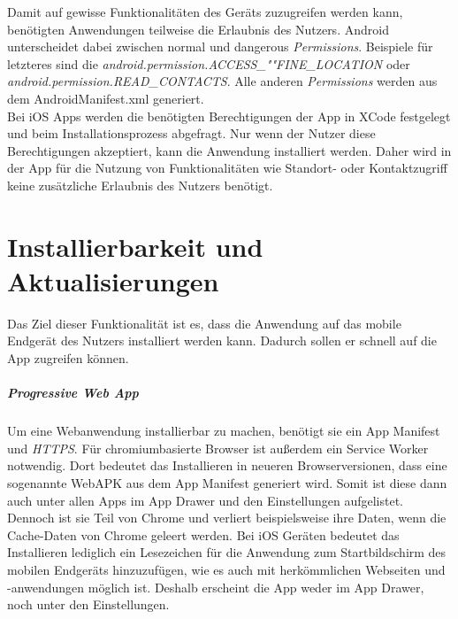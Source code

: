 Damit auf gewisse Funktionalitäten des Geräts zuzugreifen werden kann, benötigten Anwendungen teilweise die Erlaubnis des Nutzers.
Android unterscheidet dabei zwischen \glqq normal\grqq{} und \glqq dangerous\grqq{} \textit{Permissions}.
Beispiele für letzteres sind die \textit{android.permission.ACCESS\_""FINE\_LOCATION} oder \textit{android.permission.READ\_CONTACTS}.
Alle anderen \textit{Permissions} werden aus dem AndroidManifest.xml generiert.\\
Bei iOS Apps werden die benötigten Berechtigungen der App in XCode festgelegt und beim Installationsprozess abgefragt.
Nur wenn der Nutzer diese Berechtigungen akzeptiert, kann die Anwendung installiert werden.
Daher wird in der App für die Nutzung von Funktionalitäten wie Standort- oder Kontaktzugriff keine zusätzliche Erlaubnis des Nutzers benötigt.

\section{Installierbarkeit und Aktualisierungen}

Das Ziel dieser Funktionalität ist es, dass die Anwendung auf das mobile Endgerät des Nutzers installiert werden kann.
Dadurch sollen er schnell auf die App zugreifen können.

\subparagraph{Progressive Web App\\}
Um eine Webanwendung installierbar zu machen, benötigt sie ein App Manifest und \textit{HTTPS}.
Für chromiumbasierte Browser ist außerdem ein Service Worker notwendig.
Dort bedeutet das Installieren in neueren Browserversionen, dass eine sogenannte WebAPK aus dem App Manifest generiert wird.
Somit ist diese dann auch unter allen Apps im App Drawer und den Einstellungen aufgelistet.
Dennoch ist sie Teil von Chrome und verliert beispielsweise ihre Daten, wenn die Cache-Daten von Chrome geleert werden.
Bei iOS Geräten bedeutet das Installieren lediglich ein Lesezeichen für die Anwendung zum Startbildschirm des mobilen Endgeräts hinzuzufügen, wie es auch mit herkömmlichen Webseiten und -anwendungen möglich ist.
Deshalb erscheint die App weder im App Drawer, noch unter den Einstellungen.

